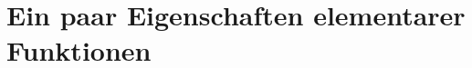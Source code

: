 \documentclass[../ana2.tex]{subfiles}
\begin{document}
\setcounter{section}{3}
\section{Ein paar Eigenschaften elementarer Funktionen}
\end{document}
